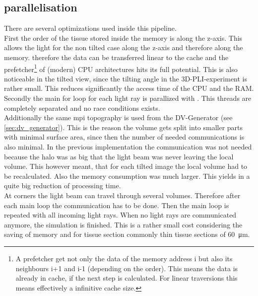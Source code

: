 \subsection{parallelisation}
% 
There are several optimizations used inside this pipeline.
\\
% 
First the order of the tissue stored inside the memory is along the z-axis.
This allows the light for the non tilted case along the z-axis and therefore along the memory.
therefore the data can be transferred linear to the cache and the prefetcher\footnote{A prefetcher get not only the data of the memory address i but also its neighbours i+1 and i-1 (depending on the order).
This means the data is already in cache, if the next step is calculated.
For linear traversions this means effectively a infinitive cache size.} of (modern) \ac{CPU} architectures hits its full potential.
This is also noticeable in the tilted view, since the tilting angle in the \ac{3D-PLI}-experiment is rather small.
This reduces significantly the access time of the \ac{CPU} and the \ac{RAM}.\\
% 
Secondly the main for loop for each light ray is parallized with \openmp{}.
This threads are completely separated and no race conditions exists.\\
% 
Additionally the same mpi topography is used from the DV-Generator (see \cref{sec:dv_generator}).
This is the reason the volume gets split into smaller parts with minimal surface area, since then the number of needed communications is also minimal.
In the previous \simpli{} implementation the communication was not needed because the halo was as big that the light beam was never leaving the local volume.
This however meant, that for each tilted image the local volume had to be recalculated.
Also the memory consumption was much larger.
This yields in a quite big reduction of processing time.
\\
% 
At corners the light beam can travel through several \mpi{} volumes.
Therefore after each main loop the communication has to be done.
Then the main loop is repeated with all incoming light rays.
When no light rays are communicated anymore, the simulation is finished.
This is a rather small cost considering the saving of memory and for tissue section commonly thin tissue sections of \SI{60}{\micro\meter}.
% 
% 
